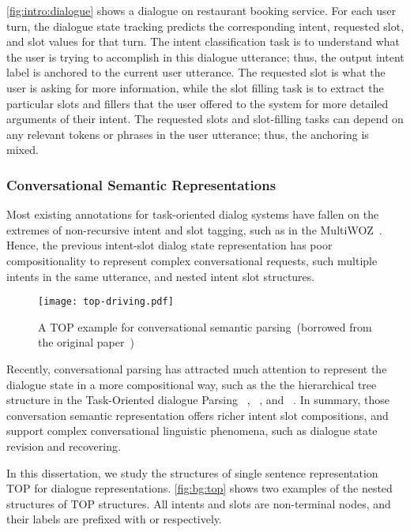 \autoref{fig:intro:dialogue} shows a dialogue on restaurant booking
service. For each user turn, the dialogue state tracking predicts the
corresponding intent, requested slot, and slot values for that
turn. The intent classification task is to understand what the user is
trying to accomplish in this dialogue utterance; thus, the output
intent label is anchored to the current user utterance. The requested
slot is what the user is asking for more information, while the slot
filling task is to extract the particular slots and fillers that the
user offered to the system for more detailed arguments of their
intent. The requested slots and slot-filling tasks can depend on any
relevant tokens or phrases in the user utterance; thus, the anchoring
is mixed.

\subsubsection{Conversational Semantic Representations}
\label{ssec:bg:dialogue-rep}
Most existing annotations for task-oriented dialog systems have fallen
on the extremes of non-recursive intent and slot tagging, such as in
the MultiWOZ~\citep{budzianowski2018multiwoz}. Hence, the previous
intent-slot dialog state representation has poor compositionality to
represent complex conversational requests, such multiple intents in the
same utterance, and nested intent slot structures.

\begin{figure}[!tbp]
\centering
\texttt{[image: top-driving.pdf]}
\caption{\label{fig:bg:top} A TOP example for conversational
  semantic parsing~(borrowed from the original
  paper~\citep{gupta-etal-2018-semantic-parsing})}
\end{figure}
Recently, conversational parsing has attracted much attention to
represent the dialogue state in a more compositional way, such as the
the hierarchical tree structure in the Task-Oriented dialogue Parsing
~\cite[TOP,][]{gupta-etal-2018-semantic-parsing,aghajanyan2020conversational},
~\cite[TreeDST,][]{cheng2020conversational}, and
~\cite[Dataflow,][]{andreas2020task}. In summary, those conversation
semantic representation offers richer intent slot compositions, and
support complex conversational linguistic phenomena, such as dialogue
state revision and recovering.

In this dissertation, we study the structures of single sentence
representation TOP for dialogue
representations. \autoref{fig:bg:top} shows two examples of the
nested structures of TOP structures. All intents and slots are
non-terminal nodes, and their labels are prefixed with  or
 respectively.

